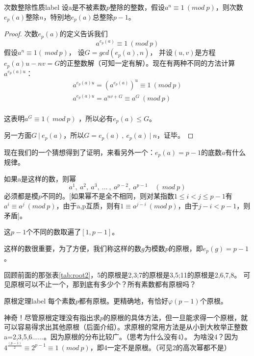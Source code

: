 \begin{theorem}{次数整除性质}{label}
	设a是不被素数$p$整除的整数，假设$a^n \equiv 1 \ (mod \ p)$，则次数$e_p(a)$整除$n$，特别地$e_p(a)$总整除$p-1$。
\end{theorem}

\begin{proof}
	次数$e_p(a)$的定义告诉我们
	$$
	a^{e_p(a)}\equiv 1 \ (mod \ p)
	$$
	假设$a^n\equiv 1(\ mod \ p)$，
	设$G=gcd(e_p(a),n)$，
	并设$(u,v)$是方程$e_p(a)u-nv=G$的正整数解（可知一定有解）。现在有两种不同的方法计算$a^{e_p(a)u}$：
	\begin{align*}
		a^{e_p(a)u}=(a^{e_p(a)})^u\equiv 1 \ (mod \ p)  \\
		a^{e_p(a)u}=a^{nv+G}\equiv a^G \ (mod \ p)  \\
	\end{align*}

	这表明$a^G\equiv 1 (\ mod \ p)$ ，所以必有$e_p(a)\le G$。
	
	另一方面$G \ | \ e_p(a)$，所以$G=e_p(a)\ ,\ e_p(a)\ | \ n$，证毕。
\end{proof}

{\heiti 现在我们的一个猜想得到了证明，来看另外一个：$e_p(a)=p-1$的底数$a$有什么规律。}

如果a是这样的数，则幂
$$
a^1,\ a^2,\ a^3,\ ...\ ,\ a^{p-2},\ a^{p-1}\quad (\ mod \ p)
$$
{\heiti 必须都是模$p$不同的。}[如果幂不是全不相同，则对某指数$1\le i <j\le p-1$有$a^i\equiv a^j \ (mod \ p)$，由于a,p互质，则有$1\equiv a^{j-i} \ (mod \ p)$，由于$j-i<p-1$，则矛盾]。

{\heiti 这$p-1$个不同的数取遍了$[1,p-1]$。}

{\heiti 这样的数很重要，为了方便，我们称这样的数$g$为模数$p$的原根，即$e_p(g)=p-1$。}

回顾前面的那张表\ref{tab:root2}，5的原根是2,3\quad ;\quad 7的原根是3,5\quad ;\quad 11的原根是2,6,7,8。
可见原根可以不止一个，那到底有多少个？所有素数都有原根吗？

\begin{theorem}{原根定理}{label}
每个素数$p$都有原根。更精确地，有恰好$\varphi(p-1)$个原根。
\end{theorem}

神奇！尽管原根定理没有指出求$p$的原根的具体方法，但一旦能求得一个原根，就可以容易得求出其他原根（后面介绍）。求原根的常用方法是从小到大枚举正整数a=2,3,5,6......。{\heiti 因为原根的分布比较广}。（思考为什么没有4）。
为啥没4？因为$4^{\frac{(p-1)}{2}}\equiv 2^{p-1}\equiv 1 \ (mod \ p)$，即4一定不是原根。（可见2的高次幂都不是）


